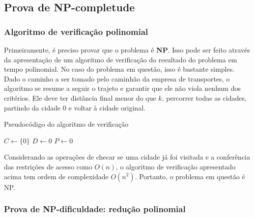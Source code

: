 \documentclass[10pt,a4paper]{article}
\numberwithin{equation}{section}
\begin{document}
\subsection{Prova de NP-completude}

\subsubsection{Algoritmo de verificação polinomial}

Primeiramente, é preciso provar que o problema é \textbf{NP}. Isso pode ser feito através da apresentação de um algoritmo de verificação do resultado do problema em tempo polinomial. No caso do problema em questão, isso é bastante simples. Dado o caminho a ser tomado pelo caminhão da empresa de transportes, o algoritmo se resume a seguir o trajeto e garantir que ele não viola nenhum dos critérios. Ele deve ter distância final menor do que $k$, percorrer todas as cidades, partindo da cidade $0$ e voltar à cidade original.

\begin{algorithm}[H]
    \DontPrintSemicolon
    \caption{Pseudocódigo do algoritmo de verificação}


    \BlankLine
    $C \gets \{0\}$ 
    $D \gets 0$ 
    $P \gets 0$ 
\end{algorithm}

Considerando as operações de checar se uma cidade já foi visitada e a conferência das restrições de acesso como $O(n)$, o algoritmo de verificação apresentado acima tem ordem de complexidade $O(n^2)$. Portanto, o problema em questão é NP.

\subsubsection{Prova de NP-dificuldade: redução polinomial}
\end{document}
